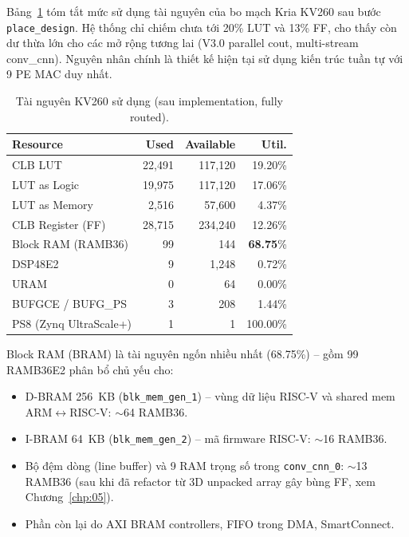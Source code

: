 Bảng~\ref{tab:fpga-utilization} tóm tắt mức sử dụng tài nguyên của bo mạch Kria KV260 sau bước \texttt{place\_design}. Hệ thống chỉ chiếm chưa tới 20\% LUT và 13\% FF, cho thấy còn dư thừa lớn cho các mở rộng tương lai (V3.0 parallel cout, multi-stream conv\_cnn). Nguyên nhân chính là thiết kế hiện tại sử dụng kiến trúc tuần tự với 9 PE MAC duy nhất.

\begin{table}[!h]
    \centering
    \caption{Tài nguyên KV260 sử dụng (sau implementation, fully routed).}
    \label{tab:fpga-utilization}
    \begin{tabular}{lrrr}
        \toprule
        \textbf{Resource} & \textbf{Used} & \textbf{Available} & \textbf{Util.} \\
        \midrule
        CLB LUT                 & 22{,}491 & 117{,}120 & 19.20\% \\
        \quad LUT as Logic      & 19{,}975 & 117{,}120 & 17.06\% \\
        \quad LUT as Memory     &  2{,}516 &  57{,}600 &  4.37\% \\
        CLB Register (FF)       & 28{,}715 & 234{,}240 & 12.26\% \\
        Block RAM (RAMB36)      &       99 &       144 & \textbf{68.75}\% \\
        DSP48E2                 &        9 &  1{,}248  &  0.72\% \\
        URAM                    &        0 &        64 &  0.00\% \\
        BUFGCE / BUFG\_PS       &        3 &       208 &  1.44\% \\
        PS8 (Zynq UltraScale+)  &        1 &         1 & 100.00\% \\
        \bottomrule
    \end{tabular}
\end{table}

Block RAM (BRAM) là tài nguyên ngốn nhiều nhất (68.75\%) -- gồm 99 RAMB36E2 phân bổ chủ yếu cho:
\begin{itemize}
    \item D-BRAM 256~KB (\texttt{blk\_mem\_gen\_1}) -- vùng dữ liệu RISC-V và shared mem ARM$\leftrightarrow$RISC-V: $\sim$64 RAMB36.
    \item I-BRAM 64~KB (\texttt{blk\_mem\_gen\_2}) -- mã firmware RISC-V: $\sim$16 RAMB36.
    \item Bộ đệm dòng (line buffer) và 9 RAM trọng số trong \texttt{conv\_cnn\_0}: $\sim$13 RAMB36 (sau khi đã refactor từ 3D unpacked array gây bùng FF, xem Chương~\ref{chp:05}).
    \item Phần còn lại do AXI BRAM controllers, FIFO trong DMA, SmartConnect.
\end{itemize}

